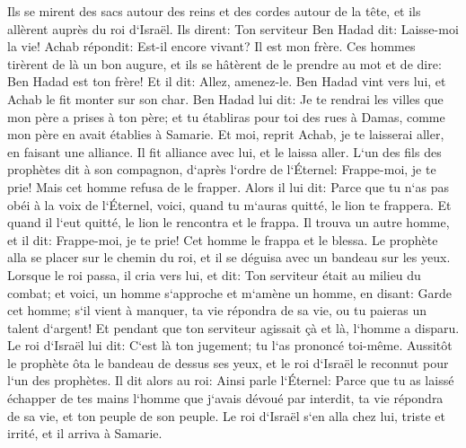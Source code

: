 \verse Ils se mirent des sacs autour des reins et des cordes autour de la tête, et ils allèrent auprès du roi d`Israël. Ils dirent: Ton serviteur Ben Hadad dit: Laisse-moi la vie! Achab répondit: Est-il encore vivant? Il est mon frère. 
\verse Ces hommes tirèrent de là un bon augure, et ils se hâtèrent de le prendre au mot et de dire: Ben Hadad est ton frère! Et il dit: Allez, amenez-le. Ben Hadad vint vers lui, et Achab le fit monter sur son char. 
\verse Ben Hadad lui dit: Je te rendrai les villes que mon père a prises à ton père; et tu établiras pour toi des rues à Damas, comme mon père en avait établies à Samarie. Et moi, reprit Achab, je te laisserai aller, en faisant une alliance. Il fit alliance avec lui, et le laissa aller. 
\verse L`un des fils des prophètes dit à son compagnon, d`après l`ordre de l`Éternel: Frappe-moi, je te prie! Mais cet homme refusa de le frapper. 
\verse Alors il lui dit: Parce que tu n`as pas obéi à la voix de l`Éternel, voici, quand tu m`auras quitté, le lion te frappera. Et quand il l`eut quitté, le lion le rencontra et le frappa. 
\verse Il trouva un autre homme, et il dit: Frappe-moi, je te prie! Cet homme le frappa et le blessa. 
\verse Le prophète alla se placer sur le chemin du roi, et il se déguisa avec un bandeau sur les yeux. 
\verse Lorsque le roi passa, il cria vers lui, et dit: Ton serviteur était au milieu du combat; et voici, un homme s`approche et m`amène un homme, en disant: Garde cet homme; s`il vient à manquer, ta vie répondra de sa vie, ou tu paieras un talent d`argent! 
\verse Et pendant que ton serviteur agissait çà et là, l`homme a disparu. Le roi d`Israël lui dit: C`est là ton jugement; tu l`as prononcé toi-même. 
\verse Aussitôt le prophète ôta le bandeau de dessus ses yeux, et le roi d`Israël le reconnut pour l`un des prophètes. 
\verse Il dit alors au roi: Ainsi parle l`Éternel: Parce que tu as laissé échapper de tes mains l`homme que j`avais dévoué par interdit, ta vie répondra de sa vie, et ton peuple de son peuple. 
\verse Le roi d`Israël s`en alla chez lui, triste et irrité, et il arriva à Samarie. 

\chapter{}


